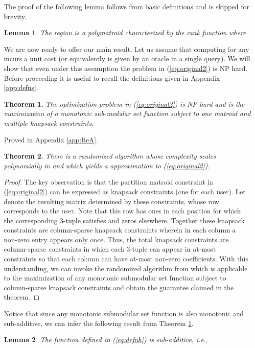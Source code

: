 \documentclass[11pt] {article}
\newtheorem{theorem}{Theorem}
\newtheorem{lemma}{Lemma}
\begin{document}
The proof  of the  following lemma  follows from basic definitions \cite{edmonds:poly} and is skipped for brevity.
 \begin{lemma}\label{lem:Lem2}
 The region  is a polymatroid characterized by the rank function  where
 
 \end{lemma}
We are now ready to offer our main result. Let us assume that computing  for any  incurs a unit cost (or equivalently is given by an oracle in a single query). We will show that even under this assumption the problem in (\ref{eq:original2}) is NP hard. Before proceeding it is useful to recall the definitions given in Appendix \ref{app:defns}.
 \begin{theorem}\label{thm:lteA}
 The optimization problem in (\ref{eq:original2}) is NP hard and is the maximization of a monotonic sub-modular set function subject to one matroid and multiple knapsack constraints.
  \end{theorem}
\proof Proved in Appendix \ref{app:lteA}. \endproof

\begin{theorem}
There is a randomized algorithm whose complexity scales polynomially in  and which yields a   approximation to (\ref{eq:original2}).
\end{theorem}
\begin{proof} The key observation is that the partition matroid constraint in (\ref{eq:original2}) can be expressed as  knapsack constraints (one for each user). Let  denote the resulting  matrix determined by these constraints, whose  row corresponds to the  user. Note that this row has ones in each position for which the corresponding 3-tuple  satisfies  and zeros elsewhere.
Together these  knapsack constraints are column-sparse knapsack constraints wherein in each column  a non-zero entry appears only once.  Thus, the total  knapsack constraints are column-sparse constraints in which each 3-tuple can appear in at-most  constraints so that each column can have at-most  non-zero coefficients.
 With this understanding, we can invoke the randomized algorithm from \cite{bansal:sparse} which is applicable to the maximization of any monotonic submodular set function subject to column-sparse knapsack constraints and obtain the guarantee claimed in the theorem.\end{proof}

Notice that since any monotonic submodular set function is also monotonic and sub-additive, we can infer the following result from  Theorem \ref{thm:lteA}.
\begin{lemma}\label{lem:lemH}
The function  defined in (\ref{eq:defnh}) is sub-additive, i.e.,

\end{lemma}
\end{document}

